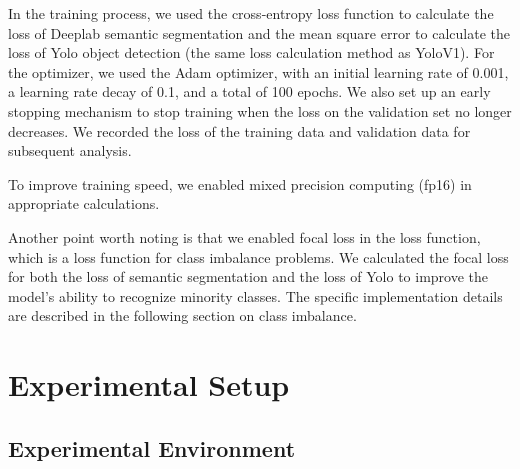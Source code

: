 \documentclass[conference]{IEEEtran}
\begin{document}


In the training process, we used the cross-entropy loss function to calculate the loss of Deeplab semantic segmentation and the mean square error to calculate the loss of Yolo object detection (the same loss calculation method as YoloV1). For the optimizer, we used the Adam optimizer, with an initial learning rate of 0.001, a learning rate decay of 0.1, and a total of 100 epochs. We also set up an early stopping mechanism to stop training when the loss on the validation set no longer decreases. We recorded the loss of the training data and validation data for subsequent analysis.

To improve training speed, we enabled mixed precision computing (fp16) in appropriate calculations.


Another point worth noting is that we enabled focal loss in the loss function, which is a loss function for class imbalance problems. We calculated the focal loss for both the loss of semantic segmentation and the loss of Yolo to improve the model's ability to recognize minority classes. The specific implementation details are described in the following section on class imbalance.

\section{Experimental Setup}
\subsection{Experimental Environment}

\end{document}
